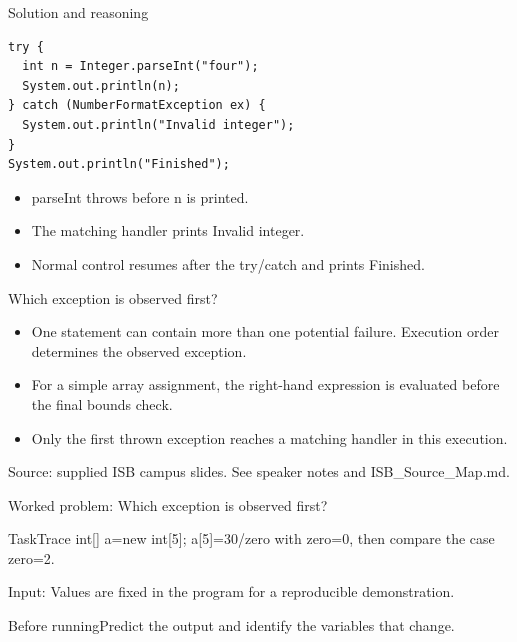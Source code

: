 \documentclass[10pt,aspectratio=169]{beamer}
\begin{document}
\begin{frame}[fragile,t]{Solution and reasoning}
\begin{lstlisting}
try {
  int n = Integer.parseInt("four");
  System.out.println(n);
} catch (NumberFormatException ex) {
  System.out.println("Invalid integer");
}
System.out.println("Finished");
\end{lstlisting}\vspace{1mm}\small\begin{itemize}
\item parseInt throws before n is printed.
\item The matching handler prints Invalid integer.
\item Normal control resumes after the try/catch and prints Finished.
\end{itemize}
\end{frame}

\begin{frame}[fragile,t]{Which exception is observed first?}
\begin{itemize}
\item One statement can contain more than one potential failure. Execution order determines the observed exception.
\item For a simple array assignment, the right{-}hand expression is evaluated before the final bounds check.
\item Only the first thrown exception reaches a matching handler in this execution.
\end{itemize}
\vspace{3mm}\footnotesize\textcolor{accent}{Source: supplied ISB campus slides. See speaker notes and ISB\_Source\_Map.md.}
\end{frame}

\begin{frame}[fragile,t]{Worked problem: Which exception is observed first?}
\begin{block}{Task}Trace int[] a=new int[5]; a[5]=30/zero with zero=0, then compare the case zero=2.\end{block}
\small Input: Values are fixed in the program for a reproducible demonstration.\par\vspace{3mm}\begin{exampleblock}{Before running}Predict the output and identify the variables that change.\end{exampleblock}
\end{frame}
\end{document}
